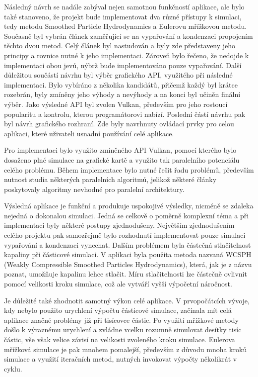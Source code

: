 Následný návrh se nadále zabýval nejen samotnou funkčností aplikace, ale bylo také stanoveno, že projekt bude implementovat dva různé přístupy k simulaci, tedy metodu Smoothed Particle Hydrodynamics a Eulerovu mřížkovou metodu. Současně byl vybrán článek \cite{Evap&Cond} zaměřující se na vypařování a kondenzaci propojením těchto dvou metod. Celý článek byl nastudován a byly zde představeny jeho principy a rovnice nutné k jeho implementaci. Zároveň bylo řečeno, že nedojde k implementaci obou jevů, nýbrž bude implementováno pouze vypařování. Další důležitou součástí návrhu byl výběr grafického API, využitého při následné implementaci. Bylo vybíráno z několika kandidátů, přičemž každý byl krátce rozebrán, byly zmíněny jeho výhody a nevýhody a na konci byl učiněn finální výběr. Jako výsledné API byl zvolen Vulkan, především pro jeho rostoucí popularitu a kontrolu, kterou programátorovi nabízí. Poslední částí návrhu pak byl návrh grafického rozhraní. Zde byly navrhnuty ovládací prvky pro celou aplikaci, které uživateli usnadní používání celé aplikace.

Pro implementaci bylo využito zmíněného API Vulkan, pomocí kterého bylo dosaženo plné simulace na grafické kartě a využito tak paralelního potenciálu celého problému. Během implementace bylo nutné řešit řadu problémů, především nutnost studia některých paralelních algoritmů, jelikož některé články poskytovaly algoritmy nevhodné pro paralelní architektury.

Výsledná aplikace je funkční a produkuje uspokojivé výsledky, nicméně se zdaleka nejedná o dokonalou simulaci. Jedná se celkově o poměrně komplexní téma a při implementaci byly některé postupy zjednodušeny. Největším zjednodušením celého projektu pak samozřejmě bylo rozhodnutí implementovat pouze simulaci vypařování a kondenzaci vynechat. Dalším problémem byla částečná stlačitelnost kapaliny při částicové simulaci. V aplikaci byla použita metoda nazvaná WCSPH (Weakly Compressible Smoothed Particles Hydrodynamics), která, jak je z názvu poznat, umožňuje kapalinu lehce stlačit. Míru stlačitelnosti lze částečně ovlivnit pomocí velikosti kroku simulace, což ale vytváří vyšší výpočetní náročnost. 

Je důležité také zhodnotit samotný výkon celé aplikace. V prvopočátcích vývoje, kdy nebylo použito urychlení výpočtu částicové simulace, začínala mít celá aplikace značné problémy již při tisícovce částic. Po využití mřížkové metody došlo k výraznému urychlení a zvládne vcelku rozumně simulovat desítky tisíc částic, vše však velice závisí na velikosti zvoleného kroku simulace. Eulerova mřížková simulace je pak mnohem pomalejší, především z důvodu mnoha kroků simulace a využití iteračních metod, nutných invokovat výpočty několikrát v cyklu.

